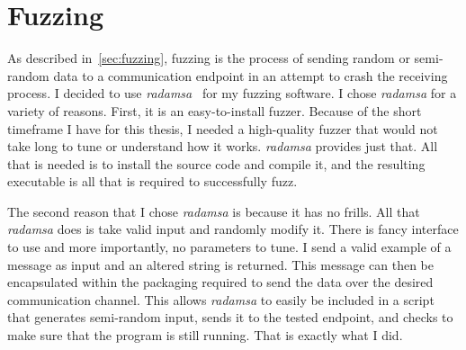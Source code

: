 \section{Fuzzing}
\label{sec:fuzzingMethods}
As described in~\ref{sec:fuzzing}, fuzzing is the process of sending random or semi-random data to a communication endpoint in an attempt to crash the receiving process.  I decided to use \textit{radamsa}~\cite{radamsa} for my fuzzing software.  I chose \textit{radamsa} for a variety of reasons.  First, it is an easy-to-install fuzzer.  Because of the short timeframe I have for this thesis, I needed a high-quality fuzzer that would not take long to tune or understand how it works.  \textit{radamsa} provides just that.  All that is needed is to install the source code and compile it, and the resulting executable is all that is required to successfully fuzz.

The second reason that I chose \textit{radamsa} is because it has no frills.  All that \textit{radamsa} does is take valid input and randomly modify it.  There is fancy interface to use and more importantly, no parameters to tune.  I send a valid example of a message as input and an altered string is returned.  This message can then be encapsulated within the packaging required to send the data over the desired communication channel.  This allows \textit{radamsa} to easily be included in a script that generates semi-random input, sends it to the tested endpoint, and checks to make sure that the program is still running.  That is exactly what I did.

